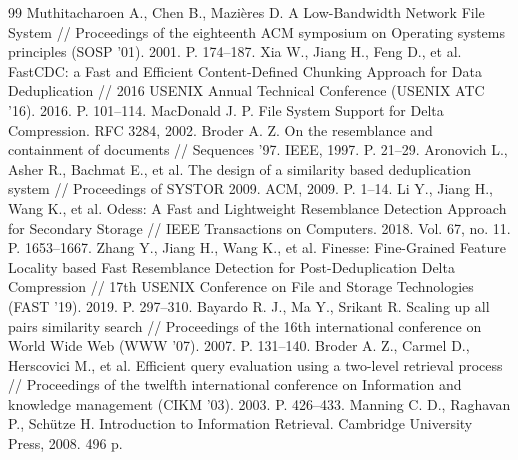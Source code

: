 \documentclass[a4paper,14pt]{extarticle}
\begin{document}
\newpage

\begin{thebibliography}{99}
 Muthitacharoen A., Chen B., Mazières D. A Low-Bandwidth Network File System // Proceedings of the eighteenth ACM symposium on Operating systems principles (SOSP '01). 2001. P. 174--187.
 Xia W., Jiang H., Feng D., et al. FastCDC: a Fast and Efficient Content-Defined Chunking Approach for Data Deduplication // 2016 USENIX Annual Technical Conference (USENIX ATC '16). 2016. P. 101--114.
 MacDonald J. P. File System Support for Delta Compression. RFC 3284, 2002.
 Broder A. Z. On the resemblance and containment of documents // Sequences '97. IEEE, 1997. P. 21--29.
 Aronovich L., Asher R., Bachmat E., et al. The design of a similarity based deduplication system // Proceedings of SYSTOR 2009. ACM, 2009. P. 1--14.
 Li Y., Jiang H., Wang K., et al. Odess: A Fast and Lightweight Resemblance Detection Approach for Secondary Storage // IEEE Transactions on Computers. 2018. Vol. 67, no. 11. P. 1653--1667.
 Zhang Y., Jiang H., Wang K., et al. Finesse: Fine-Grained Feature Locality based Fast Resemblance Detection for Post-Deduplication Delta Compression // 17th USENIX Conference on File and Storage Technologies (FAST '19). 2019. P. 297--310.
 Bayardo R. J., Ma Y., Srikant R. Scaling up all pairs similarity search // Proceedings of the 16th international conference on World Wide Web (WWW '07). 2007. P. 131--140.
 Broder A. Z., Carmel D., Herscovici M., et al. Efficient query evaluation using a two-level retrieval process // Proceedings of the twelfth international conference on Information and knowledge management (CIKM '03). 2003. P. 426--433.
 Manning C. D., Raghavan P., Schütze H. Introduction to Information Retrieval. Cambridge University Press, 2008. 496 p.
\end{thebibliography}
\end{document}
